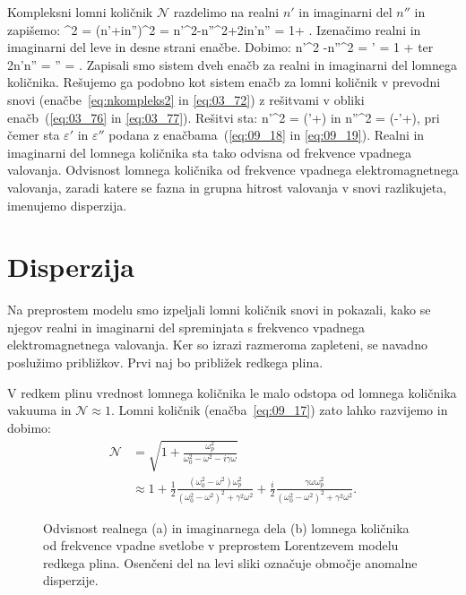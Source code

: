 Kompleksni lomni količnik $\mathcal{N}$ razdelimo na realni $n'$ in imaginarni del $n''$ in 
zapišemo:
\beq
{}^2 = (n'+in'')^2 = n'^2-n''^2+2in'n'' =  1+ .
\label{eq:09_17}
\eeq
Izenačimo realni in imaginarni del leve in desne strani enačbe. Dobimo:
\beq
n'^2 -n''^2 = \varepsilon' = 1 + 
\label{eq:09_18}
\eeq
ter 
\beq
2n'n'' = \varepsilon'' = .
\label{eq:09_19}
\eeq
Zapisali smo sistem dveh enačb za realni in imaginarni del lomnega količnika. Rešujemo ga podobno kot
sistem enačb za lomni količnik v prevodni snovi (enačbe~\ref{eq:nkompleks2} in \ref{eq:03_72})
z rešitvami v obliki enačb~(\ref{eq:03_76} in \ref{eq:03_77}). Rešitvi sta:
\beq
n'^2 = \left(\varepsilon'+\right)
\label{eq:09_20}
\eeq
in
\beq
n''^2 = \left(-\varepsilon'+\right)\!,
\label{eq:09_21}
\eeq
pri čemer sta $\varepsilon'$ in $\varepsilon''$ podana z enačbama~(\ref{eq:09_18} in \ref{eq:09_19}).
Realni in imaginarni del lomnega količnika sta tako odvisna od frekvence vpadnega valovanja. 
Odvisnost lomnega količnika od frekvence vpadnega elektromagnetnega valovanja, zaradi katere
se fazna in grupna hitrost valovanja v snovi razlikujeta, imenujemo disperzija.

\section{Disperzija}
Na preprostem modelu smo izpeljali lomni količnik snovi in pokazali,
kako se njegov realni in imaginarni del
spreminjata s frekvenco vpadnega elektromagnetnega valovanja. Ker so izrazi
razmeroma zapleteni, se navadno poslužimo približkov. Prvi naj 
bo približek redkega plina. 

V redkem plinu vrednost lomnega količnika le malo odstopa od lomnega količnika vakuuma 
in $\mathcal{N} \approx 1$. Lomni količnik (enačba~\ref{eq:09_17}) zato lahko razvijemo in dobimo:
\begin{align}
\mathcal{N} &= \sqrt{1+ \frac{\omega_p^2}{\omega_0^2 - \omega^2 - i\gamma \omega}} \\
&\approx 1 + \frac{1}{2}\frac{\left(\omega_0^2 - \omega^2\right)\omega_p^2}{\left(\omega_0^2 - 
\omega^2\right)^2 + \gamma^2 \omega^2} + \frac{i}{2}\frac{\gamma \omega \omega_p^2}{\left(\omega_0^2 - 
\omega^2\right)^2 + \gamma^2 \omega^2}.
\label{eq:09_22}
\end{align}
\begin{figure}[h!]
\centering
\def\svgwidth{140truemm} 

\caption{Odvisnost realnega (a) in imaginarnega dela (b) lomnega količnika od 
frekvence vpadne svetlobe v preprostem Lorentzevem modelu redkega plina. Osenčeni del na levi 
sliki označuje območje anomalne disperzije.}
\label{fig:09_nkompleks}
\end{figure}

